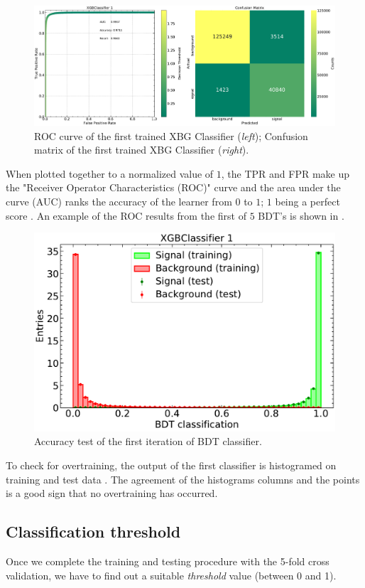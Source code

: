 \begin{figure}[H]
    \centering
    \includegraphics[width=0.90\linewidth]{graphs/clf0.pdf}
    \caption{ROC curve of the first trained XBG Classifier (\emph{left}); Confusion matrix of the first trained XBG Classifier (\emph{right}).}
    \label{roc}
\end{figure}

When plotted together to a normalized value of $1$, the TPR and FPR make up the "Receiver Operator Characteristics (ROC)" curve and the area under the curve (AUC) ranks the accuracy of the learner from $0$ to $1$; $1$ being a perfect score \cite{roc}. An example of the ROC results from the first of $5$ BDT's is shown in .

\begin{figure}[H]
    \centering
    \includegraphics[width=0.6\linewidth]{graphs/train_test0.pdf}
    \caption{Accuracy test of the first iteration of BDT classifier.}
    \label{traintest}
\end{figure}

To check for overtraining, the output of the first classifier is histogramed on training and test data . The agreement of the histograms columns and the points is a good sign that no overtraining has occurred.

\subsection{Classification threshold}
Once we complete the training and testing procedure with the 5-fold cross validation, we have to find out a suitable \emph{threshold} value (between 0 and 1).

